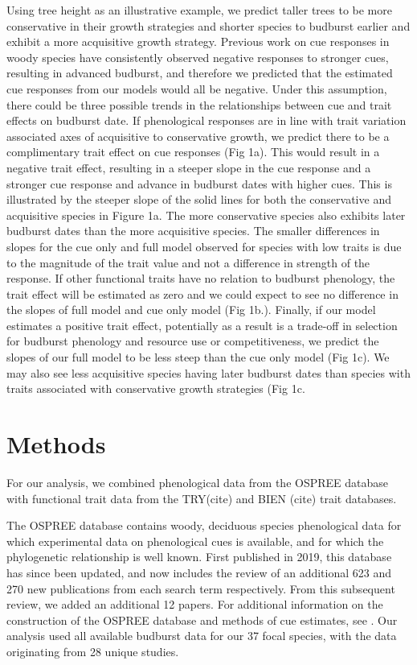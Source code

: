 \documentclass{article}\usepackage[]{graphicx}\usepackage[]{color}
\begin{document}
Using tree height as an illustrative example, we predict taller trees to be more conservative in their growth strategies and shorter species to budburst earlier and exhibit a more acquisitive growth strategy. Previous work on cue responses in woody species have consistently observed negative responses to stronger cues, resulting in advanced budburst, and therefore we predicted that the estimated cue responses from our models would all be negative. Under this assumption, there could be three possible trends in the relationships between cue and trait effects on budburst date. If phenological responses are in line with trait variation associated axes of acquisitive to conservative growth, we predict there to be a complimentary %
 trait effect on cue responses (Fig 1a). This would result in a negative trait effect, resulting in a steeper slope in the cue response and a stronger cue response and advance in budburst dates with higher cues. This is illustrated by the steeper slope of the solid lines for both the conservative and acquisitive species in Figure 1a. The more conservative species also exhibits later budburst dates than the more acquisitive species. The smaller differences in slopes for the cue only and full model observed for species with low traits is due to the magnitude of the trait value and not a difference in strength of the response. If other functional traits have no relation to budburst phenology, the trait effect will be estimated as zero and we could expect to see no difference in the slopes of full model and cue only model (Fig 1b.). Finally, if our model estimates a positive trait effect, potentially as a result is a trade-off in selection for budburst phenology and resource use or competitiveness, we predict the slopes of our full model to be less steep than the cue only model (Fig 1c). We may also see less acquisitive species having later budburst dates than species with traits associated with conservative growth strategies (Fig 1c.

\section{Methods}
For our analysis, we combined phenological data from the OSPREE database \citep{OSPREE} with functional trait data from the TRY(cite) and BIEN (cite) trait databases. 

The OSPREE database contains woody, deciduous species phenological data for which experimental data on phenological cues is available, and for which the phylogenetic relationship is well known. First published in 2019, this database has since been updated, and now includes the review of an additional 623 and 270 new publications from each search term respectively. From this subsequent review, we added an additional 12 papers. For additional information on the construction of the OSPREE database and methods of cue estimates, see \citep{OSPREE}. Our analysis used all available budburst data for our 37 focal species, with the data originating from 28 unique studies. 
\end{document}
